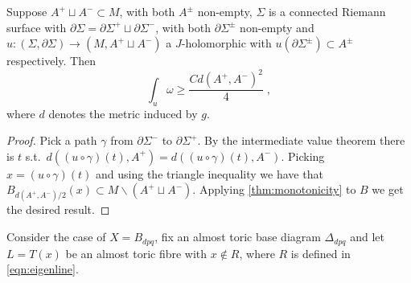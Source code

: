 \documentclass[12pt,a4paper,draft]{scrartcl}
\begin{document}
\begin{corollary}
  \label{thm:small_buffer}
  Suppose $A^+ ⊔ A^- ⊂ M$, with both $A^±$ non-empty, $Σ$ is a connected Riemann surface with $∂Σ = ∂Σ^+ ⊔ ∂Σ^-$, with both $∂Σ^±$ non-empty and $u\colon (Σ,∂Σ) → (M,A^+ ⊔ A^-)$ a $J$-holomorphic with $u(∂Σ^±) ⊂ A^±$ respectively.
  Then
  \[∫_u ω ≥ \frac{C d(A^+,A^-)^2}{4} \; ,\]
  where $d$ denotes the metric induced by $g$.
\end{corollary}

\begin{proof}
  Pick a path $γ$ from $∂Σ^-$ to $∂Σ^+$. By the intermediate value theorem there is $t$ s.t.\ $d((u ∘ γ) (t),A^+) = d((u ∘ γ)(t), A^-)$. Picking $x = (u ∘ γ)(t)$ and using the triangle inequality we have that $B_{d(A^+,A^-)/2}(x) ⊂ M ∖ ( A^+ ⊔ A^-) $. Applying \cref{thm:monotonicity} to $B$ we get the desired result.
\end{proof}

Consider the case of $X = B_{dpq}$, fix an almost toric base diagram $\Delta_{dpq}$ and let $L = T(x)$ be an almost toric fibre with $x \notin R$, where $R$ is defined in \eqref{eqn:eigenline}. 
\end{document}
